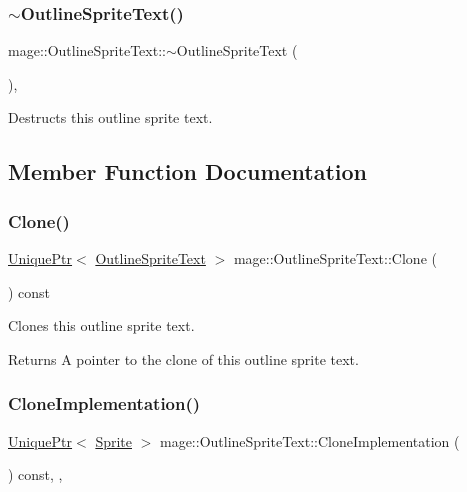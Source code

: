 \subsubsection{\texorpdfstring{$\sim$\+Outline\+Sprite\+Text()}{~OutlineSpriteText()}}
{\footnotesize\ttfamily mage\+::\+Outline\+Sprite\+Text\+::$\sim$\+Outline\+Sprite\+Text (\begin{DoxyParamCaption}{ }\end{DoxyParamCaption})\hspace{0.3cm}{\ttfamily [virtual]}, {\ttfamily [default]}}

Destructs this outline sprite text. 

\subsection{Member Function Documentation}
\hypertarget{classmage_1_1_outline_sprite_text_aa188cb104f6f00fdc75c532d66869f02}{}\label{classmage_1_1_outline_sprite_text_aa188cb104f6f00fdc75c532d66869f02} 
\subsubsection{\texorpdfstring{Clone()}{Clone()}}
{\footnotesize\ttfamily \hyperlink{namespacemage_a3316d7143a973e37adf1110f2e80ca31}{Unique\+Ptr}$<$ \hyperlink{classmage_1_1_outline_sprite_text}{Outline\+Sprite\+Text} $>$ mage\+::\+Outline\+Sprite\+Text\+::\+Clone (\begin{DoxyParamCaption}{ }\end{DoxyParamCaption}) const}

Clones this outline sprite text.

\begin{DoxyReturn}{Returns}
A pointer to the clone of this outline sprite text. 
\end{DoxyReturn}
\hypertarget{classmage_1_1_outline_sprite_text_ac1fcc7e91b972b250e09fbb8d62f908d}{}\label{classmage_1_1_outline_sprite_text_ac1fcc7e91b972b250e09fbb8d62f908d} 
\subsubsection{\texorpdfstring{Clone\+Implementation()}{CloneImplementation()}}
{\footnotesize\ttfamily \hyperlink{namespacemage_a3316d7143a973e37adf1110f2e80ca31}{Unique\+Ptr}$<$ \hyperlink{classmage_1_1_sprite}{Sprite} $>$ mage\+::\+Outline\+Sprite\+Text\+::\+Clone\+Implementation (\begin{DoxyParamCaption}{ }\end{DoxyParamCaption}) const\hspace{0.3cm}{\ttfamily [override]}, {\ttfamily [private]}, {\ttfamily [virtual]}}

